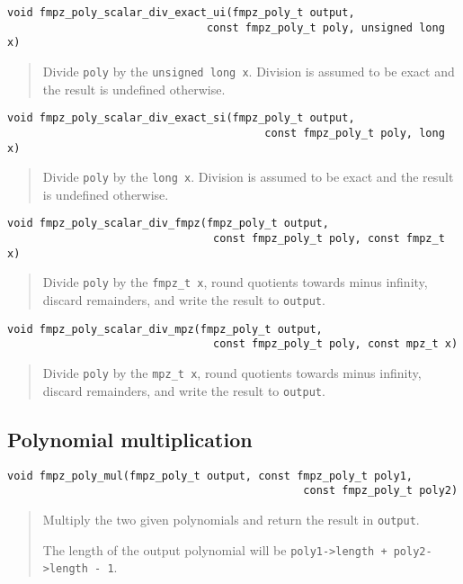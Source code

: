 \documentclass[a4paper,10pt]{article}
\newcommand{\code}{\lstinline}
\begin{document}
\begin{lstlisting}
void fmpz_poly_scalar_div_exact_ui(fmpz_poly_t output, 
                               const fmpz_poly_t poly, unsigned long x)
\end{lstlisting}
\begin{quote}
Divide \code{poly} by the \code{unsigned long x}. Division is assumed to be exact and the result is undefined otherwise.
\end{quote}

\begin{lstlisting}
void fmpz_poly_scalar_div_exact_si(fmpz_poly_t output, 
                                        const fmpz_poly_t poly, long x)
\end{lstlisting}
\begin{quote}
Divide \code{poly} by the \code{long x}. Division is assumed to be exact and the result is undefined otherwise.
\end{quote}

\begin{lstlisting}
void fmpz_poly_scalar_div_fmpz(fmpz_poly_t output, 
                                const fmpz_poly_t poly, const fmpz_t x) 
\end{lstlisting}
\begin{quote}
Divide \code{poly} by the \code{fmpz_t x}, round quotients towards minus infinity, discard remainders, and write the result to \code{output}. 
\end{quote}

\begin{lstlisting}
void fmpz_poly_scalar_div_mpz(fmpz_poly_t output, 
                                const fmpz_poly_t poly, const mpz_t x) 
\end{lstlisting}
\begin{quote}
Divide \code{poly} by the \code{mpz_t x}, round quotients towards minus infinity, discard remainders, and write the result to \code{output}. 
\end{quote}

\subsection{Polynomial multiplication}

\begin{lstlisting}
void fmpz_poly_mul(fmpz_poly_t output, const fmpz_poly_t poly1, 
                                              const fmpz_poly_t poly2) 
\end{lstlisting}
\begin{quote}
Multiply the two given polynomials and return the result in \code{output}.

The length of the output polynomial will be \code{poly1->length + poly2->length - 1}.
\end{quote}
\end{document}
